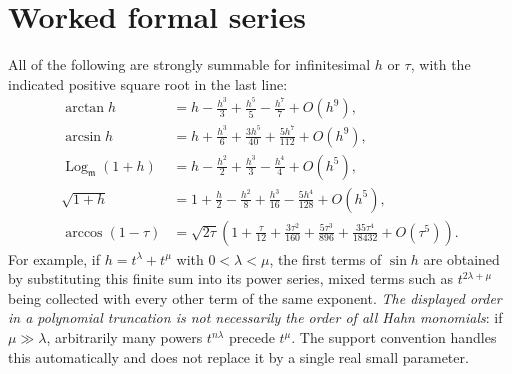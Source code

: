 \documentclass[11pt,letterpaper]{article}
\numberwithin{equation}{section}
\theoremstyle{definition}
\theoremstyle{remark}
\newcommand{\mm}{\mathfrak m}
\newcommand{\Logm}{\operatorname{Log}_{\mm}}
\begin{document}
\section{Worked formal series}\label{trigonometry:app:series}
All of the following are strongly summable for infinitesimal $h$ or $\tau$, with the indicated
positive square root in the last line:
\begin{align*}
 \arctan h&=h-\frac{h^3}3+\frac{h^5}5-\frac{h^7}7+O(h^9),\\
 \arcsin h&=h+\frac{h^3}6+\frac{3h^5}{40}+\frac{5h^7}{112}+O(h^9),\\
 \Logm(1+h)&=h-\frac{h^2}2+\frac{h^3}3-\frac{h^4}4+O(h^5),\\
 \sqrt{1+h}&=1+\frac h2-\frac{h^2}8+\frac{h^3}{16}-\frac{5h^4}{128}+O(h^5),\\
 \arccos(1-\tau)&=\sqrt{2\tau}\left(1+\frac\tau{12}+\frac{3\tau^2}{160}+\frac{5\tau^3}{896}
 +\frac{35\tau^4}{18432}+O(\tau^5)\right).
\end{align*}
For example, if $h=t^\lambda+t^\mu$ with $0<\lambda<\mu$, the first terms of $\sin h$ are obtained
by substituting this finite sum into its power series, mixed terms such as $t^{2\lambda+\mu}$ being
collected with every other term of the same exponent. \emph{The displayed order in a polynomial
truncation is not necessarily the order of all Hahn monomials}: if $\mu\gg\lambda$, arbitrarily
many powers $t^{n\lambda}$ precede $t^\mu$. The support convention handles this automatically and
does not replace it by a single real small parameter.
\end{document}
